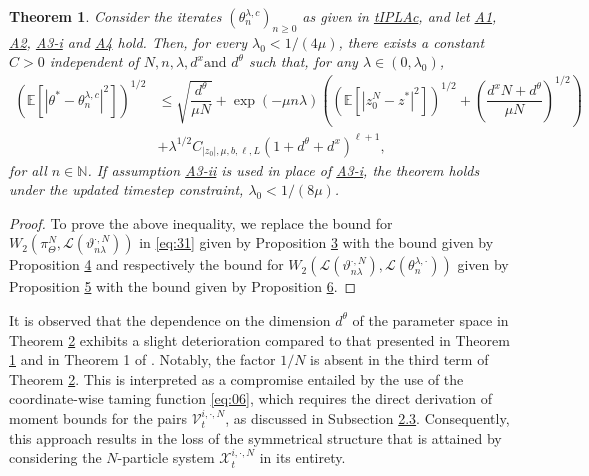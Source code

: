 \documentclass[a4paper, 10pt]{article}
\theoremstyle{plain}%
\newtheorem{theorem}{Theorem}
\begin{document}
\noindent \begin{theorem}\label{theorem:2} Consider the iterates $({\theta}^{\lambda,c}_{n})_{n\geq 0}$ as given in \hyperref[algo2]{tIPLAc}, and let \hyperlink{Assum1}{A1}, \hyperlink{Assum2}{A2}, \hyperlink{Assum3a}{A3-i} and \hyperlink{Assum4}{A4} hold. Then, for every $\lambda_0<1/(4\mu)$, there exists a constant $C>0$ independent of $N,n,\lambda,d^x \text{and } d^{\theta}$ such that, for any $\lambda\in(0,\lambda_0)$,
\begin{align*}
\left(\mathbb{E}\left[|{\theta}^{*}-{\theta}^{\lambda,c}_{n}|^2\right]\right)^{1/2}&\leq \sqrt{\dfrac{d^{\theta}}{\mu N}}+\exp{(-\mu n\lambda)}\left(\left(\mathbb{E}\left[|z_0^N-z^*|^2\right]\right)^{1/2}+\left(\dfrac{d^x N+d^{\theta}}{\mu N}\right)^{1/2}\right)\\
&+\lambda^{1/2} C_{|z_0|,\mu,b,\ell,L}(1+d^{\theta}+d^x)^{\ell+1},
\end{align*}
for all $n\in\mathbb{N}$. If assumption \hyperlink{Assum3b}{A3-ii} is used in place of \hyperlink{Assum3a}{A3-i}, the theorem holds under the updated timestep constraint, $\lambda_0<1/(8\mu)$.\end{theorem}
\begin{proof}
To prove the above inequality, we replace the bound for $W_2(\pi_{\Theta}^N,\mathcal{L}(\vartheta^{\cdot,N}_{n\lambda}))$ in \eqref{eq:31} given by Proposition  \hyperlink{Prop3}{3} with the bound given by Proposition \hyperlink{Prop7}{4} and respectively the bound for $W_2(\mathcal{L}(\vartheta^{\cdot,N}_{n\lambda}),\mathcal{L}(\theta_{n}^{\lambda,\cdot}))$ given by Proposition  \hyperlink{Prop5}{5} with the bound given by Proposition \hyperlink{Prop6}{6}.
\end{proof}
\noindent It is observed that the dependence on the dimension $d^{\theta}$ of the parameter space in Theorem \hyperref[theorem:2]{2} exhibits a slight deterioration compared to that presented in Theorem \hyperref[theorem:1]{1} and in Theorem 1 of \cite{Ipla}. Notably, the factor $1/N$ is absent in the third term of Theorem \hyperref[theorem:2]{2}. This is interpreted as a compromise entailed by the use of the coordinate-wise taming function \eqref{eq:06}, which requires the direct derivation of moment bounds for the pairs $\mathcal{V}_t^{i,\cdot,N}$, as discussed in Subsection \hyperref[essential]{2.3}. Consequently, this approach results in the loss of the symmetrical structure that is attained by considering the $N$-particle system $\mathcal{X}_t^{i,\cdot,N}$ in its entirety.\\
\end{document}
